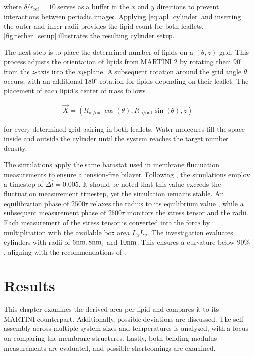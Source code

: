 \documentclass[
    11pt,
    a4paper,
    oneside,        %
    BCOR=10mm,      %
    parskip=half,   %
    listof=nototoc,   %
    bibliography=totoc %
]{scrreprt}
\begin{document}
where $\delta/r_\text{ref} = 10$ serves as a buffer in the $x$ and $y$ directions to prevent interactions between periodic images. Applying \cref{eq:apl_cylinder} and inserting the outer and inner radii provides the lipid count for both leaflets. \cref{fig:tether_setup} illustrates the resulting cylinder setup.

The next step is to place the determined number of lipids on a $(\theta,z)$ grid. This process adjusts the orientation of lipids from MARTINI 2 by rotating them $90^\circ$ from the $z$-axis into the $xy$-plane. A subsequent rotation around the grid angle $\theta$ occurs, with an additional $180^\circ$ rotation for lipids depending on their leaflet. The placement of each lipid's center of mass follows

\begin{align}
    \vec{X} = (R_\text{in/out}\cos(\theta), R_\text{in/out}\sin(\theta),z)
\end{align}

for every determined grid pairing in both leaflets. Water molecules fill the space inside and outside the cylinder until the system reaches the target number density. 

The simulations apply the same barostat used in membrane fluctuation measurements to ensure a tension-free bilayer. Following \citeauthor{Markus_tethers} \cite{Markus_tethers}, the simulations employ a timestep of $\Delta \hat{t} = 0.005$. It should be noted that this value exceeds the fluctuation measurement timestep, yet the simulation remains stable. An equilibration phase of $2500 \tau$ relaxes the radius to its equilibrium value \cite{Markus_tethers}, while a subsequent measurement phase of $2500 \tau$ monitors the stress tensor and the radii. Each measurement of the stress tensor is converted into the force by multiplication with the available box area $L_xL_y$. The investigation evaluates cylinders with radii of $6\si{{\nano}{\m}}, 8\si{{\nano}{\m}},$ and $10\si{{\nano}{\m}}$. This ensures a curvature below $90\%$, aligning with the recommendations of \citeauthor{Markus_tethers} \cite{Markus_tethers}. 


\chapter{Results}\label{ch:results}

This chapter examines the derived area per lipid and compares it to its MARTINI counterpart. Additionally, possible deviations are discussed. The self-assembly across multiple system sizes and temperatures is analyzed, with a focus on comparing the membrane structures. Lastly, both bending modulus measurements are evaluated, and possible shortcomings are examined. 
\end{document}
